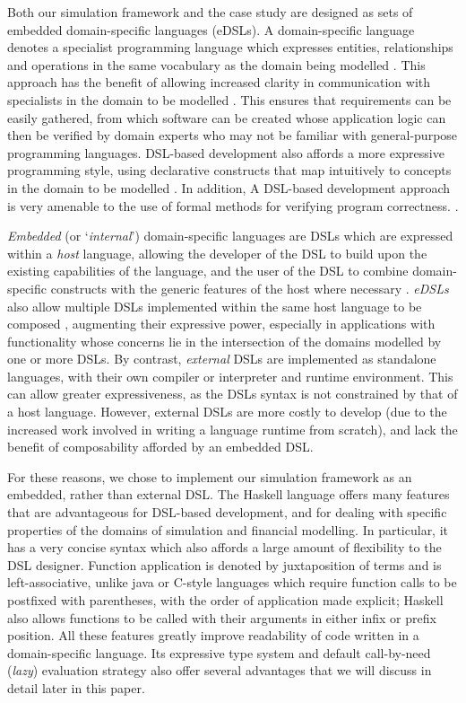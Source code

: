 \documentclass[a4paper, 11pt]{article}
\begin{document}
Both our simulation framework and the case study are designed as sets of embedded domain-specific languages (eDSLs). A domain-specific language denotes a specialist programming language which expresses entities, relationships and operations in the same vocabulary as the domain being modelled \cite{Ghosh2011}. This approach has the benefit of allowing increased clarity in communication with specialists in the domain to be modelled \cite{Ghosh2011}. This ensures that requirements can be easily gathered, from which software can be created whose application logic can then be verified by domain experts who may not be familiar with general-purpose programming languages. DSL-based development also affords a more expressive programming style, using declarative constructs that map intuitively to concepts in the domain to be modelled \cite{VanDeursen2000}. In addition, A DSL-based development approach is very amenable to the use of formal methods for verifying program correctness. \cite{Hudak1996a}.

\emph{Embedded} (or `\emph{internal}') domain-specific languages are DSLs which are expressed within a \emph{host} language, allowing the developer of the DSL to build upon the existing capabilities of the language, and the user of the DSL to combine domain-specific constructs with the generic features of the host where necessary \cite{Ghosh2010}. \emph{eDSLs} also allow multiple DSLs implemented within the same host language to be composed \cite{Mak2007}, augmenting their expressive power, especially in applications with functionality whose concerns lie in the intersection of the domains modelled by one or more DSLs. By contrast, \emph{external} DSLs are implemented as standalone languages, with their own compiler or interpreter and runtime environment. This can allow greater expressiveness, as the DSLs syntax is not constrained by that of a host language. However, external DSLs are more costly to develop (due to the increased work involved in writing a language runtime from scratch), and lack the benefit of composability afforded by an embedded DSL.

For these reasons, we chose to implement our simulation framework as an embedded, rather than external DSL. The Haskell language offers many features that are advantageous for DSL-based development, and for dealing with specific properties of the domains of simulation and financial modelling. In particular, it has a very concise syntax which also affords a large amount of flexibility to the DSL designer. Function application is denoted by juxtaposition of terms and is left-associative, unlike java or C-style languages which require function calls to be postfixed with parentheses, with the order of application made explicit; Haskell also allows functions to be called with their arguments in either infix or prefix position. All these features greatly improve readability of code written in a domain-specific language. Its expressive type system and default call-by-need (\emph{lazy}) evaluation strategy also offer several advantages that we will discuss in detail later in this paper.
\end{document}
